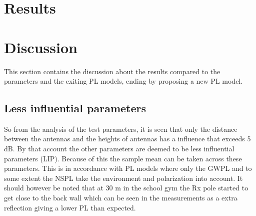 \section{Results}


\section{Discussion}
This section contains the discussion about the results compared to the parameters and the exiting PL models, ending by proposing a new PL model.

\subsection{Less influential parameters}

So from the analysis of the test parameters, it is seen that only the distance between the antennas and the heights of antennas has a influence that exceeds 5 dB. By that account the other parameters are deemed to be less influential parameters (LIP). Because of this the sample mean can be taken across these parameters. This is in accordance with PL models where only the GWPL and to some extent the NSPL take the environment and polarization into account. It should however be noted that at 30 m in the school gym the Rx pole started to get close to the back wall which can be seen in the measurements as a extra reflection giving a lower PL than expected.






